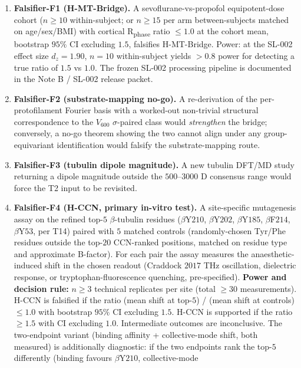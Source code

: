 \documentclass[11pt,a4paper]{article}
\begin{document}
\begin{enumerate}\itemsep0pt
  \item \textbf{Falsifier-F1 (H-MT-Bridge).} A sevoflurane-vs-propofol
    equipotent-dose cohort ($n \geq 10$ within-subject; or $n \geq 15$
    per arm between-subjects matched on age/sex/BMI) with cortical
    R\textsubscript{phase} ratio $\leq 1.0$ at the cohort mean,
    bootstrap $95\%$ CI excluding $1.5$, falsifies H-MT-Bridge.
    Power: at the SL-002 effect size $d_z = 1.90$, $n=10$ within-subject
    yields $> 0.8$ power for detecting a true ratio of $1.5$ vs $1.0$.
    The frozen SL-002 processing pipeline is documented in the
    Note B / SL-002 release packet.
  \item \textbf{Falsifier-F2 (substrate-mapping no-go).} A re-derivation of the per-protofilament
    Fourier basis with a worked-out non-trivial structural correspondence
    to the $V_{600}$ $\sigma$-paired class would \emph{strengthen} the
    bridge; conversely, a no-go theorem showing the two cannot align
    under any group-equivariant identification would falsify the
    substrate-mapping route.
  \item \textbf{Falsifier-F3 (tubulin dipole magnitude).} A new tubulin DFT/MD study returning a
    dipole magnitude outside the $500$--$3000$ D consensus range
    would force the \textsf{T2} input to be revisited.
  \item \textbf{Falsifier-F4 (H-CCN, primary in-vitro test).} A
    site-specific mutagenesis assay on the refined top-$5$
    $\beta$-tubulin residues ($\beta$Y$210$, $\beta$Y$202$,
    $\beta$Y$185$, $\beta$F$214$, $\beta$Y$53$, per \textsf{T14})
    paired with $5$ matched controls (randomly-chosen Tyr/Phe
    residues outside the top-$20$ CCN-ranked positions, matched on
    residue type and approximate B-factor). For each pair the assay
    measures the anaesthetic-induced shift in the chosen readout
    (Craddock $2017$ THz oscillation, dielectric response, or
    tryptophan-fluorescence quenching, pre-specified).
    \textbf{Power and decision rule:} $n \geq 3$ technical replicates
    per site (total $\geq 30$ measurements). H-CCN is falsified if the
    ratio (mean shift at top-$5$) / (mean shift at controls)
    $\leq 1.0$ with bootstrap $95\%$ CI excluding $1.5$. H-CCN is
    supported if the ratio $\geq 1.5$ with CI excluding $1.0$.
    Intermediate outcomes are inconclusive. The two-endpoint variant
    (binding affinity + collective-mode shift, both measured) is
    additionally diagnostic: if the two endpoints rank the top-$5$
    differently (binding favours $\beta$Y$210$, collective-mode

\end{enumerate}
\end{document}
